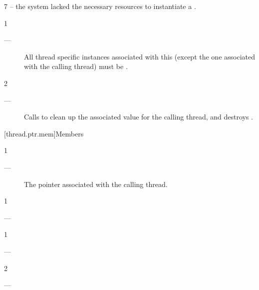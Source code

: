 \documentclass[fontsize=10pt,paper=A4,pagesize,DIV=15]{scrartcl}
\begin{document}
7 \errors
{} -- the system lacked the necessary
resources to instantiate a \tptr.


1 \precond
\begin{description}
    \item[---] All thread specific instances associated with this \tptr
               (except the one associated with the calling thread) must be
               .
\end{description}

2 \effects
\begin{description}
    \item[---] Calls  to clean up the associated value for the
               calling thread, and destroys \this.
\end{description}


[thread.ptr.mem]{Members}


1 \returns
\begin{description}
    \item[---] The pointer associated with the calling thread.
\end{description}


1 \returns
\begin{description}
    \item[---] 
\end{description}


1 \precond
\begin{description}
    \item[---] 
\end{description}

2 \returns
\begin{description}
    \item[---] 
\end{description}
\end{document}
